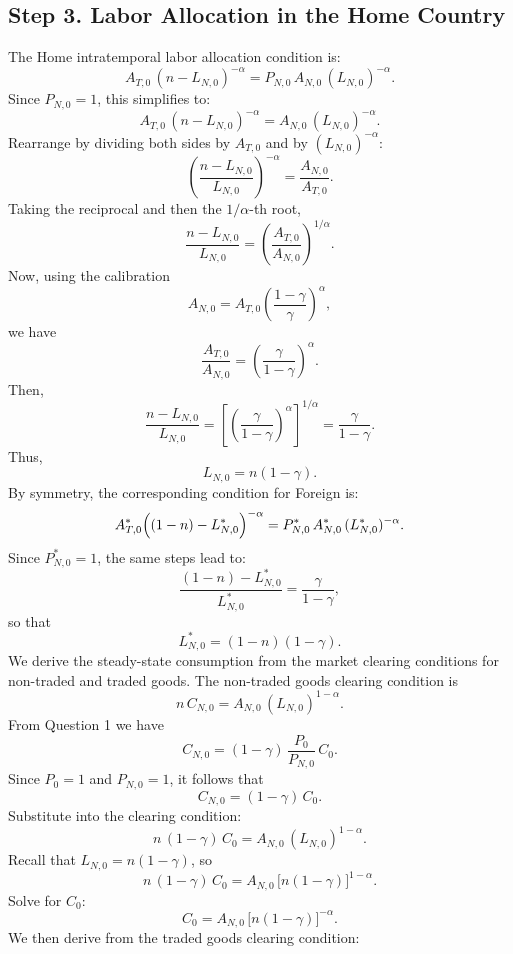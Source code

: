\documentclass[a4paper,12pt]{article} %
\theoremstyle{nonitalic}
\begin{document}
\subsection*{Step 3. Labor Allocation in the Home Country}
The Home intratemporal labor allocation condition is:
\[
A_{T,0}\,(n-L_{N,0})^{-\alpha} = P_{N,0}\,A_{N,0}\,(L_{N,0})^{-\alpha}.
\]
Since $P_{N,0}=1$, this simplifies to:
\[
A_{T,0}\,(n-L_{N,0})^{-\alpha} = A_{N,0}\,(L_{N,0})^{-\alpha}.
\]
Rearrange by dividing both sides by $A_{T,0}$ and by $(L_{N,0})^{-\alpha}$:
\[
\left(\frac{n-L_{N,0}}{L_{N,0}}\right)^{-\alpha} = \frac{A_{N,0}}{A_{T,0}}.
\]
Taking the reciprocal and then the $1/\alpha$-th root,
\[
\frac{n-L_{N,0}}{L_{N,0}} = \left(\frac{A_{T,0}}{A_{N,0}}\right)^{1/\alpha}.
\]
Now, using the calibration 
\[
A_{N,0} = A_{T,0}\left(\frac{1-\gamma}{\gamma}\right)^{\alpha},
\]
we have
\[
\frac{A_{T,0}}{A_{N,0}} = \left(\frac{\gamma}{1-\gamma}\right)^{\alpha}.
\]
Then,
\[
\frac{n-L_{N,0}}{L_{N,0}} = \left[\left(\frac{\gamma}{1-\gamma}\right)^{\alpha}\right]^{1/\alpha} = \frac{\gamma}{1-\gamma}.
\]
Thus,
\[
\boxed{L_{N,0} = n(1-\gamma).}
\]
By symmetry, the corresponding condition for Foreign is:
\[
A^*_{T,0}\Bigl((1-n)-L^*_{N,0}\Bigr)^{-\alpha} = P^*_{N,0}\,A^*_{N,0}\,(L^*_{N,0})^{-\alpha}.
\]
Since $P^*_{N,0}=1$, the same steps lead to:
\[
\frac{(1-n)-L^*_{N,0}}{L^*_{N,0}} = \frac{\gamma}{1-\gamma},
\]
so that
\[
\boxed{L^*_{N,0} = (1-n)(1-\gamma).}
\]
We derive the steady-state consumption from the market clearing conditions for non-traded and traded goods.
The non-traded goods clearing condition is
\[
n\,C_{N,0} = A_{N,0}\,(L_{N,0})^{1-\alpha}.
\]
From Question 1 we have
\[
C_{N,0} = (1-\gamma)\,\frac{P_0}{P_{N,0}}\,C_0.
\]
Since $P_0=1$ and $P_{N,0}=1$, it follows that
\[
C_{N,0} = (1-\gamma)\,C_0.
\]
Substitute into the clearing condition:
\[
n\,(1-\gamma)\,C_0 = A_{N,0}\,(L_{N,0})^{1-\alpha}.
\]
Recall that $L_{N,0} = n(1-\gamma)$, so
\[
n\,(1-\gamma)\,C_0 = A_{N,0}\,\bigl[n(1-\gamma)\bigr]^{1-\alpha}.
\]
Solve for $C_0$:
\[
C_0 = A_{N,0}\, \bigl[n(1-\gamma)\bigr]^{-\alpha}.
\]
We then derive from the traded goods clearing condition:
\end{document}
